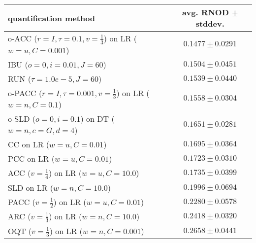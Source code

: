 \begin{tabular}{lc}
  \toprule
  quantification method & avg. RNOD $\pm$ stddev. \\
  \midrule
  o-ACC ($r=I, \tau=0.1, v=\frac{1}{3}$) on LR ($w=u, C=0.001$) & $\mathbf{0.1477 \pm 0.0291}$ \\
  IBU ($o=0, i=0.01, J=60$) & $0.1504 \pm 0.0451$ \\
  RUN ($\tau=1.0e-5, J=60$) & $0.1539 \pm 0.0440$ \\
  o-PACC ($r=I, \tau=0.001, v=\frac{1}{3}$) on LR ($w=n, C=0.1$) & $0.1558 \pm 0.0304$ \\
  o-SLD ($o=0, i=0.1$) on DT ($w=n, c=G, d=4$) & $0.1651 \pm 0.0281$ \\
  CC on LR ($w=u, C=0.01$) & $0.1695 \pm 0.0364$ \\
  PCC on LR ($w=u, C=0.01$) & $0.1723 \pm 0.0310$ \\
  ACC ($v=\frac{1}{4}$) on LR ($w=u, C=10.0$) & $0.1735 \pm 0.0399$ \\
  SLD on LR ($w=n, C=10.0$) & $0.1996 \pm 0.0694$ \\
  PACC ($v=\frac{1}{2}$) on LR ($w=u, C=0.01$) & $0.2280 \pm 0.0578$ \\
  ARC ($v=\frac{1}{3}$) on LR ($w=n, C=10.0$) & $0.2418 \pm 0.0320$ \\
  OQT ($v=\frac{1}{3}$) on LR ($w=n, C=0.001$) & $0.2658 \pm 0.0441$ \\
  \bottomrule
\end{tabular}
